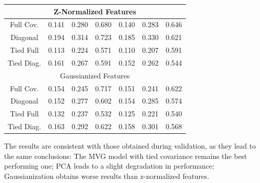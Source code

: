 \documentclass[12pt,a4paper]{article}
\begin{document}
\begin{center}
\begin{tabular}{c|ccc|ccc}
        \hline
        \multicolumn{7}{c}{Z-Normalized Features}                                                                                                                           \\
        \hline
        Full Cov.  & 0.141                          & 0.280                    & 0.680                & 0.140                & 0.283                & 0.646                 \\
        Diagonal   & 0.194                          & 0.314                    & 0.723                & 0.185                & 0.330                & 0.621                 \\
        Tied Full  & {\color{red} 0.113 }           & {\color{red} 0.224 }     & 0.571                & {\color{red} 0.110 } & {\color{red} 0.207 } & 0.591                 \\
        Tied Diag. & 0.161                          & 0.267                    & 0.591                & 0.152                & 0.262                & {\color{blue} 0.544 } \\

        \hline
        \multicolumn{7}{c}{Gaussianized Features}                                                                                                                           \\
        \hline
        Full Cov.  & 0.154                          & 0.245                    & 0.717                & 0.151                & 0.241                & 0.622                 \\
        Diagonal   & 0.152                          & 0.277                    & 0.602                & 0.154                & 0.285                & 0.574                 \\
        Tied Full  & 0.132                          & {\color{blue} 0.237 }    & {\color{red} 0.532 } & 0.125                & 0.221                & {\color{red} 0.540 }  \\
        Tied Diag. & 0.163                          & 0.292                    & 0.622                & 0.158                & 0.301                & 0.568                 \\
    \end{tabular}
\end{center}

The results are consistent with those obtained during validation, as they lead to the same conclusions:
The MVG model with tied covariance remains the best performing one;
PCA leads to a slight degradation in performance;
Gaussianization obtains worse results than z-normalized features.
\end{document}
